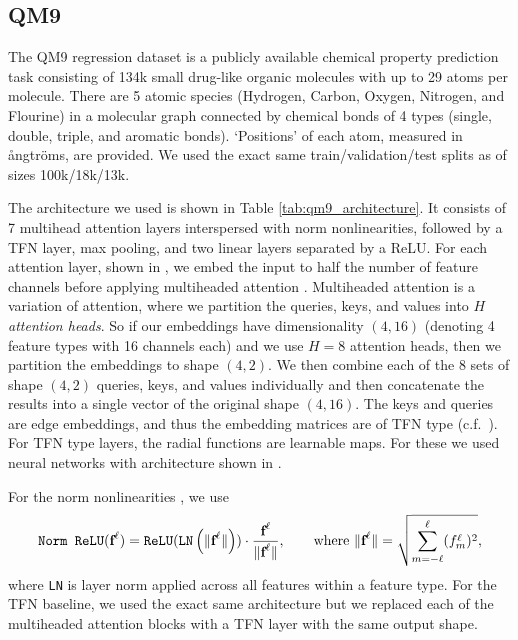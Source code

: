 \subsection{QM9} \label{sec:QM9_details} The QM9 regression dataset \citep{RamakrishnanDRvL14} is a publicly available chemical property prediction task consisting of 134k small drug-like organic molecules with up to 29 atoms per molecule. There are 5 atomic species (Hydrogen, Carbon, Oxygen, Nitrogen, and Flourine) in a molecular graph connected by chemical bonds of 4 types (single, double, triple, and aromatic bonds). `Positions' of each atom, measured in {\aa}ngtr\"oms, are provided. We used the exact same train/validation/test splits as \citet{anderson2019cormorant} of sizes 100k/18k/13k. 

The architecture we used is shown in Table \ref{tab:qm9_architecture}. It consists of 7 multihead attention layers interspersed with norm nonlinearities, followed by a TFN layer, max pooling, and two linear layers separated by a ReLU. For each attention layer, shown in , we embed the input to half the number of feature channels before applying multiheaded attention \cite{VaswaniSPUJGKP17}. Multiheaded attention is a variation of attention, where we partition the queries, keys, and values into $H$ \emph{attention heads}. So if our embeddings have dimensionality $(4,16)$ (denoting 4 feature types with 16 channels each) and we use $H=8$ attention heads, then we partition the embeddings to shape $(4,2)$. We then combine each of the 8 sets of shape $(4,2)$ queries, keys, and values individually and then concatenate the results into a single vector of the original shape $(4,16)$. The keys and queries are edge embeddings, and thus the embedding matrices are of TFN type (c.f.\ ). For TFN type layers, the radial functions are learnable maps. For these we used neural networks with architecture shown in .

For the norm nonlinearities \cite{WorrallGRB2016}, we use 
\begin{align}
\label{eq:norm-nonlinearity}
    \texttt{Norm ReLU}(\textbf{f}^{\ell}) = \texttt{ReLU}(\texttt{LN} \left ( \|\textbf{f}^{\ell}\| \right ) ) \cdot \frac{\textbf{f}^{\ell}}{\|\textbf{f}^{\ell}\|}, \qquad \text{where }
    \|\textbf{f}^\ell\| = \sqrt {\sum_{m=-\ell}^\ell (f_m^{\ell})^2 },
\end{align}
where \texttt{LN} is layer norm \cite{BaKH16} applied across all features within a feature type. For the TFN baseline, we used the exact same architecture but we replaced each of the multiheaded attention blocks with a TFN layer with the same output shape.

